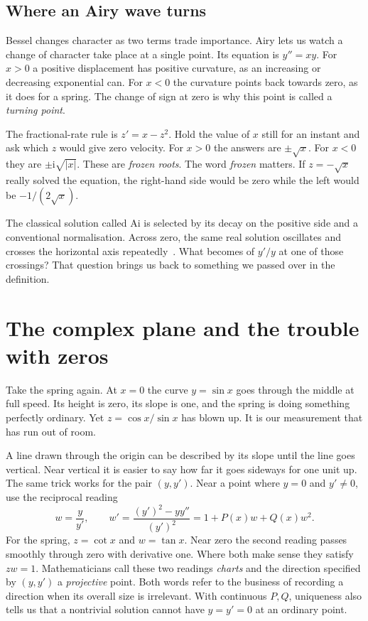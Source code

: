 \documentclass[11pt,a4paper]{amsart}
\newcommand{\ii}{\mathrm{i}}
\theoremstyle{definition}
\theoremstyle{remark}
\begin{document}
\subsection{Where an Airy wave turns}
Bessel changes character as two terms trade importance. Airy lets us watch a change of character take place at a single point. Its equation is \(y''=xy\). For \(x>0\) a positive displacement has positive curvature, as an increasing or decreasing exponential can. For \(x<0\) the curvature points back towards zero, as it does for a spring. The change of sign at zero is why this point is called a \emph{turning point}.

The fractional-rate rule is \(z'=x-z^2\). Hold the value of \(x\) still for an instant and ask which \(z\) would give zero velocity. For \(x>0\) the answers are \(\pm\sqrt{x}\). For \(x<0\) they are \(\pm\ii\sqrt{|x|}\). These are \emph{frozen roots}. The word \emph{frozen} matters. If \(z=-\sqrt{x}\) really solved the equation, the right-hand side would be zero while the left would be \(-1/(2\sqrt{x})\).

The classical solution called \(\mathrm{Ai}\) is selected by its decay on the positive side and a conventional normalisation. Across zero, the same real solution oscillates and crosses the horizontal axis repeatedly~\cite{NISTAiry}. What becomes of \(y'/y\) at one of those crossings? That question brings us back to something we passed over in the definition.

\section{The complex plane and the trouble with zeros}\label{sec:complex}
Take the spring again. At \(x=0\) the curve \(y=\sin x\) goes through the middle at full speed. Its height is zero, its slope is one, and the spring is doing something perfectly ordinary. Yet \(z=\cos x/\sin x\) has blown up. It is our measurement that has run out of room.

A line drawn through the origin can be described by its slope until the line goes vertical. Near vertical it is easier to say how far it goes sideways for one unit up. The same trick works for the pair \((y,y')\). Near a point where \(y=0\) and \(y'\ne0\), use the reciprocal reading
\[
 w=\frac{y}{y'},\qquad
 w'=\frac{(y')^2-yy''}{(y')^2}=1+P(x)w+Q(x)w^2 .
\]
For the spring, \(z=\cot x\) and \(w=\tan x\). Near zero the second reading passes smoothly through zero with derivative one. Where both make sense they satisfy \(zw=1\). Mathematicians call these two readings \emph{charts} and the direction specified by \((y,y')\) a \emph{projective} point. Both words refer to the business of recording a direction when its overall size is irrelevant. With continuous \(P,Q\), uniqueness also tells us that a nontrivial solution cannot have \(y=y'=0\) at an ordinary point.
\end{document}
